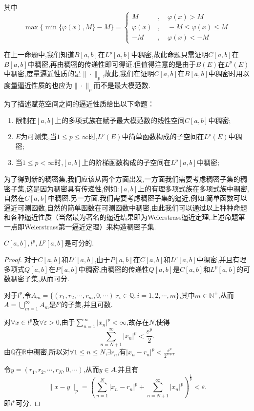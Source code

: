\documentclass[lang=cn,18pt]{elegantbook}
\begin{document}
\begin{remark}
其中
    \[
	\max \{\min\{\varphi(x),M\}-M\} = 
\begin{cases}
    M &, \quad \varphi(x) >M \\
    \varphi(x) &, \quad -M \leqslant \varphi(x) \leqslant M \\
    -M &, \quad \varphi(x) < -M
\end{cases}
\]
\end{remark}
\begin{note}
    在上一命题中,我们知道$B[a,b]$在$L^p[a,b]$中稠密,故此命题只需证明$C[a,b]$在$B[a,b]$中稠密,再由稠密的传递性即可得证.但值得注意的是由于$B(E)$在$L^p(E)$中稠密,度量逼近性质的是$\| \cdot \|_p$,故此,我们在证明$C[a,b]$在$B[a,b]$中稠密时用以度量逼近性质的也应为$\| \cdot \|_p$而不是最大模范数.
\end{note}
\begin{note}
    为了描述赋范空间之间的逼近性质给出以下命题：
    \begin{enumerate}
        \item 限制在$[a,b]$上的多项式族在赋予最大模范数的线性空间$C[a,b]$中稠密;
        \item $E$为可测集,当$ 1\leqslant p \leqslant \infty$时,$L^p(E)$中简单函数构成的子空间在$L^p(E)$中稠密;
        \item 当$1 \leqslant p < \infty$时,$[a,b]$上的阶梯函数构成的子空间在$L^p[a,b]$中稠密;
    \end{enumerate}
    为了得到新的稠密集,我们应该从两个方面出发,一方面我们需要考虑稠密子集的稠密子集,这是因为稠密具有传递性,例如:$[a,b]$上的有理多项式族在多项式族中稠密,自然在$C[a,b]$中稠密.另一方面,我们需要考虑稠密子集的逼近,例如:简单函数可以逼近可测函数,自然的简单函数在可测函数中稠密,由此我们可以通过以上种种命题和各种逼近性质（当然最为著名的逼近结果即为Weierstrass逼近定理,上述命题第一点即Weierstrass第一逼近定理）来构造稠密子集.
\end{note}

\begin{theorem}
    $C[a,b],l^p,L^p[a,b]$是可分的.
\end{theorem}
\begin{proof}
    对于$C[a,b]$和$L^p[a,b]$,由于$P[a,b]$在$C[a,b]$和$L^p[a,b]$中稠密,并且有理多项式$Q[a,b]$在$P[a,b]$中稠密,由稠密的传递性$Q[a,b]$是$C[a,b]$和$L^p[a,b]$的可数稠密子集,从而可分.

    对于$l^p$,令$A_m=\{(r_1,r_2,\cdots,r_m,0,\cdots)|r_i \in \mathbb{Q},i=1,2,\cdots,m\}$,其中$m \in \mathbb{N}^+$,从而$A=\bigcup\limits_{m=1}^{\infty}A_m$是$l^p$的子集,并且可数.

    对$\forall x \in l^p$及$\forall \varepsilon > 0$,由于$\sum\limits_{n=1}^{\infty}|x_n|^p < \infty$,故存在$N$,使得
    $$\sum\limits_{n=N+1}^{\infty}|x_n|^p < \frac{\varepsilon^p}{2}.$$
    由$\mathbb{Q}$在$\mathbb{R}$中稠密,所以对$\forall 1 \leqslant n \leqslant N$,$\exists r_n$,有$|x_n -r_n|^p < \frac{\varepsilon^p}{2^{n+1}}$

    令$y=(r_1,r_2,\cdots,r_N,0,\cdots)$,从而$y \in A$,并且有
    $$\|x-y\|_p=\left(\sum\limits_{n=1}^{N}|x_n -r_n|^p + \sum\limits_{n=N+1}^{\infty}|x_n|^p \right)^{\frac{1}{p}} < \varepsilon.$$
    即$l^p$可分.
\end{proof}
\end{document}

